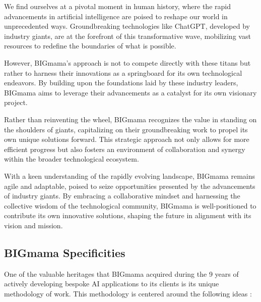 \noindent We find ourselves at a pivotal moment in human history, where the rapid advancements in artificial intelligence are poised to reshape our world in unprecedented ways. Groundbreaking technologies like ChatGPT, developed by industry giants, are at the forefront of this transformative wave, mobilizing vast resources to redefine the boundaries of what is possible.

However, BIGmama's approach is not to compete directly with these titans but rather to harness their innovations as a springboard for its own technological endeavors. By building upon the foundations laid by these industry leaders, BIGmama aims to leverage their advancements as a catalyst for its own visionary project.

Rather than reinventing the wheel, BIGmama recognizes the value in standing on the shoulders of giants, capitalizing on their groundbreaking work to propel its own unique solutions forward. This strategic approach not only allows for more efficient progress but also fosters an environment of collaboration and synergy within the broader technological ecosystem.

With a keen understanding of the rapidly evolving landscape, BIGmama remains agile and adaptable, poised to seize opportunities presented by the advancements of industry giants. By embracing a collaborative mindset and harnessing the collective wisdom of the technological community, BIGmama is well-positioned to contribute its own innovative solutions, shaping the future in alignment with its vision and mission.

\subsection{BIGmama Specificities} \label{specificities}

One of the valuable heritages that BIGmama acquired during the 9 years of actively developing bespoke AI applications to its clients is its unique methodology of work. This methodology is centered around the following ideas :

